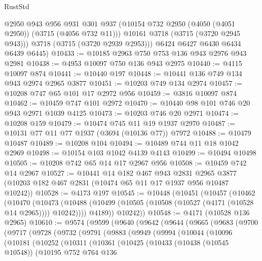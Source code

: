 \begin{lexlean}{RustStd}
\begin{coremodule}
          @2950
          @943
          @956
          @931
          @301
          @937
          (@10154 @732 @2950 (@4050 (@4051 @2950)) (@3715 (@4056 @732 @11)))
          @10161
          @3718
          (@3715 (@3720 @2945 @943)))
        @3718
        (@3715 (@3720 @2939 @2953)))
      @6424
      @6427
      @6430
      @6434
      @6439
      @6445)
@10433 := @10185 @2963 @750 @753 @136 @943 @2976 @943 @2981
@10438 := @4953 @10097 @750 @136 @943 @2975
@10440 := @4115 @10097 @874
@10441 := @10440 @197
@10448 := @10441 @136 @749 @134 @943 @2974 @2965 @3877
@10451 := @10203 @749 @134 @2974
@10457 := @10208 @747 @65 @101 @17 @2972 @956
@10459 := @3816 @10097 @874
@10462 := @10459 @747 @101 @2972
@10470 := @10440 @98 @101 @746 @20 @943 @2971 @1039 @4125
@10473 := @10203 @746 @20 @2971
@10474 := @10208 @159
@10479 := @10474 @745 @11 @19 @1937 @2970
@10487 := @10131 @77 @11 @77 @1937 (@3694 (@10136 @77)) @7972
@10488 := @10479 @10487
@10489 := @10208 @104
@10494 := @10489 @744 @11 @18 @1042 @2969
@10498 := @10154 @103 @1042 @4139 @4143
@10499 := @10494 @10498
@10505 := @10208 @742 @65 @14 @17 @2967 @956
@10508 := @10459 @742 @14 @2967
@10527 := @10441
    @14
    @182
    @467
    @943
    @2831
    @2965
    @3877
    (@10203 @182 @467 @2831 (@10474 @65 @11 @17 @1937 @956 @10487 @10242))
@10528 := @4173 @197
@10545 := @10448
    (@10451
      (@10457
        (@10462
          (@10470
            (@10473 (@10488 (@10499 (@10505 (@10508 (@10527 (@4171 (@10528 @14 @2965)))) @10242))))
            @4189))
        @10242))
@10548 := @4171 (@10528 @136 @2965)
@10610 := @9574
    (@9599
      (@9640
        (@9642
          (@9644
            (@9665
              (@9683
                (@9700
                  (@9717
                    (@9728
                      (@9732
                        (@9791
                          (@9883
                            (@9949
                              (@9994
                                (@10044
                                  (@10096
                                    (@10181
                                      (@10252
                                        (@10311
                                          (@10361
                                            (@10425
                                              (@10433
                                                (@10438 (@10545 @10548))
                                                (@10195
                                                  @752
                                                  @764
                                                  @136

\end{coremodule}
\end{lexlean}
